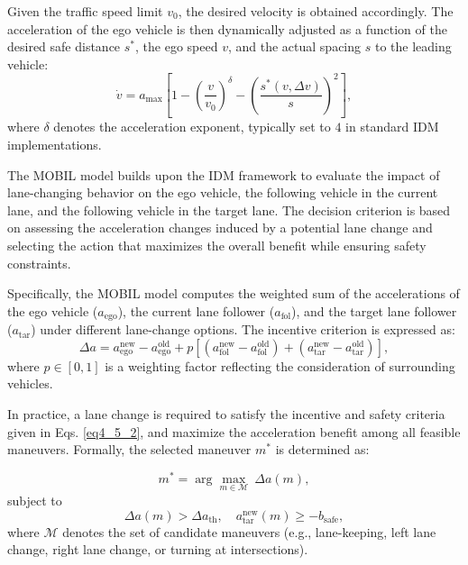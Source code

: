 \documentclass[preprint,12pt,authoryear]{elsarticle}
\begin{document}
Given the traffic speed limit $v_0$, the desired velocity is obtained accordingly. The acceleration of the ego vehicle is then dynamically adjusted as a function of the desired safe distance $s^{*}$, the ego speed $v$, and the actual spacing $s$ to the leading vehicle:
\begin{equation}
\dot{v} = a_{\max} \left[ 1 - \left(\frac{v}{v_0}\right)^{\delta} - 
\left(\frac{s^{*}(v, \Delta v)}{s}\right)^{2} \right],
\label{eq4_5}
\end{equation}
where $\delta$ denotes the acceleration exponent, typically set to $4$ in standard IDM implementations.

The MOBIL model builds upon the IDM framework to evaluate the impact of lane-changing behavior on the ego vehicle, the following vehicle in the current lane, and the following vehicle in the target lane. The decision criterion is based on assessing the acceleration changes induced by a potential lane change and selecting the action that maximizes the overall benefit while ensuring safety constraints.

Specifically, the MOBIL model computes the weighted sum of the accelerations of the ego vehicle ($a_{\text{ego}}$), the current lane follower ($a_{\text{fol}}$), and the target lane follower ($a_{\text{tar}}$) under different lane-change options. The incentive criterion is expressed as:
\begin{equation}
\Delta a = a_{\text{ego}}^{\text{new}} - a_{\text{ego}}^{\text{old}} 
+ p \left[ \left(a_{\text{fol}}^{\text{new}} - a_{\text{fol}}^{\text{old}}\right) 
+ \left(a_{\text{tar}}^{\text{new}} - a_{\text{tar}}^{\text{old}}\right) \right],
\label{eq4_6}
\end{equation}
where $p \in [0,1]$ is a weighting factor reflecting the consideration of surrounding vehicles. 

In practice, a lane change is required to satisfy the incentive and safety criteria given in Eqs. \ref{eq4_5_2}, and maximize the acceleration benefit among all feasible maneuvers. Formally, the selected maneuver $m^{*}$ is determined as:

\begin{equation}
m^{*} = \arg \max_{m \in \mathcal{M}} \ \Delta a(m),
\label{eq4_5_1}
\end{equation}
subject to
\begin{equation}
\Delta a(m) > \Delta a_{\text{th}}, \quad 
a_{\text{tar}}^{\text{new}}(m) \geq -b_{\text{safe}},
\label{eq4_5_2}
\end{equation}
where $\mathcal{M}$ denotes the set of candidate maneuvers (e.g., lane-keeping, left lane change, right lane change, or turning at intersections). 
\end{document}
